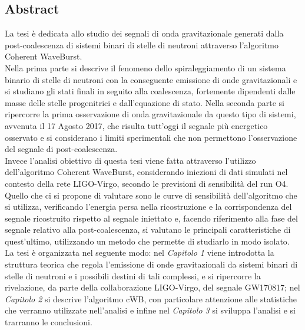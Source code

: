 \begin{changemargin}{2cm}{2cm}
	\chapter{Abstract}
		La tesi è dedicata allo studio dei segnali di onda gravitazionale generati dalla post-coalescenza di sistemi binari di stelle di neutroni attraverso l'algoritmo Coherent WaveBurst.\\
		Nella prima parte si descrive il fenomeno dello spiraleggiamento di un sistema binario di stelle di neutroni con la conseguente emissione di onde gravitazionali e si studiano gli stati finali in seguito alla coalescenza, fortemente dipendenti dalle masse delle stelle progenitrici e dall'equazione di stato. Nella seconda parte si ripercorre la prima osservazione di onda gravitazionale da questo tipo di sistemi, avvenuta il 17 Agosto 2017, che risulta tutt'oggi il segnale più energetico osservato e si considerano i limiti sperimentali che non permettono l'osservazione del segnale di post-coalescenza. \\
		Invece l'analisi obiettivo di questa tesi viene fatta attraverso l'utilizzo dell'algoritmo Coherent WaveBurst, considerando iniezioni di dati simulati nel contesto della rete LIGO-Virgo, secondo le previsioni di sensibilità del run O4. Quello che ci si propone di valutare sono le curve di sensibilità dell'algoritmo che si utilizza, verificando l'energia persa nella ricostruzione e la corrispondenza del segnale ricostruito rispetto al segnale iniettato e, facendo riferimento alla fase del segnale relativo alla post-coalescenza, si valutano le principali caratteristiche di quest'ultimo, utilizzando un metodo che permette di studiarlo in modo isolato. \\
		La tesi è organizzata nel seguente modo: nel \textit{Capitolo 1} viene introdotta la struttura teorica che regola l'emissione di onde gravitazionali da sistemi binari di stelle di neutroni e i possibili destini di tali complessi, e si ripercorre la rivelazione, da parte della collaborazione LIGO-Virgo, del segnale GW170817; nel \textit{Capitolo 2} si descrive l'algoritmo cWB, con particolare attenzione alle statistiche che verranno utilizzate nell'analisi e infine nel \textit{Capitolo 3} si sviluppa l'analisi e si trarranno le conclusioni.
\end{changemargin}
\tableofcontents